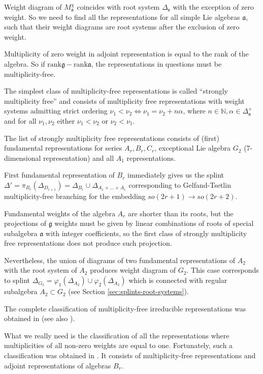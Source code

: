 \documentclass{article}
\newcommand{\gf}{\mathfrak{g}}
\newcommand{\af}{\mathfrak{a}}
\newcommand{\sfr}{\mathfrak{s}}
\begin{document}
Weight diagram of $M^{\chi}_{\af}$ coincides with root system $\Delta_{\sfr}$ with the exception of
zero weight. So we need to find all the representations for all simple Lie algebras $\af$, such that
their weight diagrams are root systems after the exclusion of zero weight.

Multiplicity of zero weight in adjoint representation is equal to the rank of the algebra. So if
$\mathrm{rank}\gf-\mathrm{rank}\af$, the representations in questions must be multiplicity-free.

The simplest class of multiplicity-free representations is called ``strongly multiplicity free''
\cite{lehrer2006strongly} and consists of multiplicity free representations with weight systems
admitting strict ordering $\nu_{1}<\nu_{2} \Leftrightarrow \nu_{1}=\nu_{2}+n \alpha$, where $n\in
\mathbb{N}, \alpha\in \Delta^{+}_{\af}$ and for all $\nu_{1},\nu_{2}$ either $\nu_{1}<\nu_{2}$ or
$\nu_{2}<\nu_{1}$.

The list of strongly multiplicity free representations consists of (first) fundamental representations
for series $A_{r}, B_{r}, C_{r}$, exceptional Lie algebra $G_{2}$ (7-dimensional representation) and
all $A_{1}$ representations. 

First fundamental representation of $B_{r}$ immediately gives us the splint $\Delta'=\pi_{B_{r}}\left(
\Delta_{D_{r+1}}\right) = \Delta_{B_{r}}\cup \Delta_{A_{1}+\dots+A_{1}}$ corresponding to Gelfand-Tsetlin
multiplicity-free branching for the embedding $so(2r+1)\to so(2r+2)$. 

Fundamental weights of the algebra $A_{r}$ are shorter than its roots, but the projections of $\gf$
weights must be given by linear combinations of roots of special subalgebra $\af$ with integer
coefficients, so the first class of strongly multiplicity free representations does not produce such
projection. 

Nevertheless, the union of diagrams of two fundamental representations of $A_{2}$ with the root
system of $A_{2}$ produces weight diagram of $G_{2}$. This case corresponds to splint
$\Delta_{G_{2}}=\varphi_{1}( \Delta_{A_{2}})\cup \varphi_{2}(\Delta_{A_{2}})$ which is connected
with regular subalgebra $A_{2}\subset G_{2}$ (see Section \ref{sec:splints-root-systems}).


The complete classification of multiplicity-free irreducible representations was obtained in
\cite{howe1995perspectives} (see also \cite{stembridge2003multiplicity}). 


What we really need is the classification of all the representations where multiplicities of all
non-zero weights are equal to one. Fortunately, such a classification was obtained in
\cite{plotkin1998visual}. It consists of multiplicity-free representations and adjoint
representations of algebras $B_{r}$. 
\end{document}
